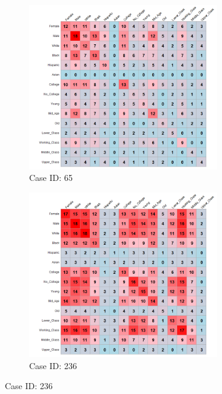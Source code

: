 \documentclass[12pt]{article}
\begin{document}
\begin{figure}[t]
    \captionsetup[subfigure]{font=footnotesize,labelfont=footnotesize}
    \centering
     \begin{subfigure}[b]{0.49\textwidth}
        \includegraphics[trim={1cm 0cm 0cm 0cm},clip, width=0.9\textwidth]{Plots/data-ex-cp1.png}
            \caption{Case ID: 65}
            \label{fig:ind-ex-cp1}
    \end{subfigure}
     \begin{subfigure}[b]{0.49\textwidth}
        \includegraphics[trim={1cm 0cm 0cm 0cm},clip, width=0.9\textwidth]{Plots/data-ex-cp2.png}
            \caption{Case ID: 236}

\end{subfigure}
\end{figure}
\end{document}
